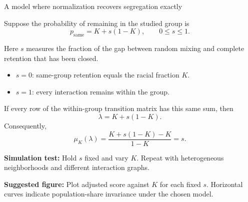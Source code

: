 \documentclass[aspectratio=169,10pt]{beamer}
\begin{document}
\begin{frame}[shrink=0]{A model where normalization recovers segregation exactly}
\small

Suppose the probability of remaining in the studied group is
\[
    p_{\mathrm{same}}=K+s(1-K),
    \qquad 0\leq s\leq1.
\]

Here $s$ measures the fraction of the gap between random mixing
and complete retention that has been closed.

\begin{itemize}
    \item $s=0$: same-group retention equals the racial fraction $K$.
    \item $s=1$: every interaction remains within the group.
\end{itemize}

If every row of the within-group transition matrix has this
same sum, then
\[
    \lambda=K+s(1-K).
\]
Consequently,
\[
    \boxed{
    \mu_K(\lambda)
      =\frac{K+s(1-K)-K}{1-K}
      =s}.
\]

\textbf{Simulation test:}
Hold $s$ fixed and vary $K$. Repeat with heterogeneous
neighborhoods and different interaction graphs.

\medskip
\textbf{Suggested figure:}
Plot adjusted score against $K$ for each fixed $s$.
Horizontal curves indicate population-share invariance
under the chosen model.

\end{frame}
\end{document}
